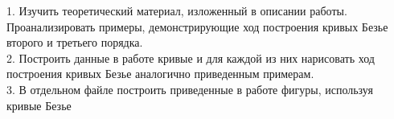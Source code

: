 1. Изучить теоретический материал, изложенный в описании работы. Проанализировать примеры, демонстрирующие ход построения кривых Безье второго и
третьего порядка.\\


2. Построить данные в работе кривые и для каждой из них нарисовать ход построения
кривых Безье аналогично приведенным примерам.\\


3. В отдельном файле построить приведенные в работе фигуры, используя кривые Безье\\
